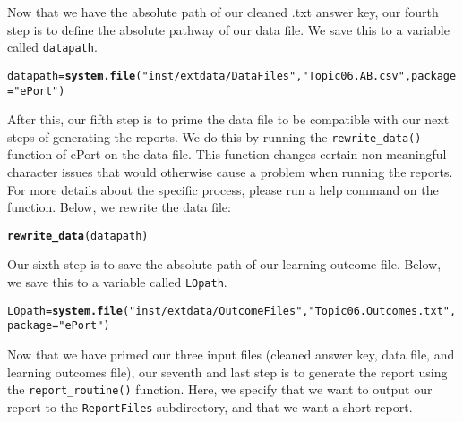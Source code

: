 \documentclass{article}\usepackage[]{graphicx}\usepackage[]{color}
\makeatletter
\newcommand{\hlstr}[1]{\textcolor[rgb]{0.192,0.494,0.8}{#1}}%
\newcommand{\hlstd}[1]{\textcolor[rgb]{0.345,0.345,0.345}{#1}}%
\newcommand{\hlkwb}[1]{\textcolor[rgb]{0.69,0.353,0.396}{#1}}%
\newcommand{\hlkwc}[1]{\textcolor[rgb]{0.333,0.667,0.333}{#1}}%
\newcommand{\hlkwd}[1]{\textcolor[rgb]{0.737,0.353,0.396}{\textbf{#1}}}%
\newenvironment{kframe}{%
 \def\at@end@of@kframe{}%
 \ifinner\ifhmode%
  \def\at@end@of@kframe{\end{minipage}}%
  \begin{minipage}{\columnwidth}%
 \fi\fi%
 \def\FrameCommand##1{\hskip\@totalleftmargin \hskip-\fboxsep
 \colorbox{shadecolor}{##1}\hskip-\fboxsep
     \hskip-\linewidth \hskip-\@totalleftmargin \hskip\columnwidth}%
 \MakeFramed {\advance\hsize-\width
   \@totalleftmargin\z@ \linewidth\hsize
   \@setminipage}}%
 {\par\unskip\endMakeFramed%
 \at@end@of@kframe}
\newenvironment{knitrout}{}{} %
\numberwithin{equation}{section} %
\makeatother
\begin{document}
Now that we have the absolute path of our cleaned .txt answer key, our fourth step is to define the absolute pathway of our data file. We save this to a variable called \texttt{datapath}.

\begin{knitrout}
\color{fgcolor}\begin{kframe}
\begin{alltt}
\hlstd{datapath} \hlkwb{=} \hlkwd{system.file}\hlstd{(}\hlstr{"inst/extdata/DataFiles"}\hlstd{,} \hlstr{"Topic06.AB.csv"}\hlstd{,} \hlkwc{package}\hlstd{=}\hlstr{"ePort"}\hlstd{)}
\end{alltt}
\end{kframe}
\end{knitrout}

After this, our fifth step is to prime the data file to be compatible with our next steps of generating the reports. We do this by running the \texttt{rewrite\_data()} function of ePort on the data file. This function changes certain non-meaningful character issues that would otherwise cause a problem when running the reports. For more details about the specific process, please run a help command on the function. Below, we rewrite the data file:

\begin{knitrout}
\color{fgcolor}\begin{kframe}
\begin{alltt}
\hlkwd{rewrite_data}\hlstd{(datapath)}
\end{alltt}
\end{kframe}
\end{knitrout}

Our sixth step is to save the absolute path of our learning outcome file. Below, we save this to a variable called \texttt{LOpath}.

\begin{knitrout}
\color{fgcolor}\begin{kframe}
\begin{alltt}
\hlstd{LOpath} \hlkwb{=} \hlkwd{system.file}\hlstd{(}\hlstr{"inst/extdata/OutcomeFiles"}\hlstd{,} \hlstr{"Topic06.Outcomes.txt"}\hlstd{,} \hlkwc{package}\hlstd{=}\hlstr{"ePort"}\hlstd{)}
\end{alltt}
\end{kframe}
\end{knitrout}

Now that we have primed our three input files (cleaned answer key, data file, and learning outcomes file), our seventh and last step is to generate the report using the \texttt{report\_routine()} function. Here, we specify that we want to output our report to the \texttt{ReportFiles} subdirectory, and that we want a short report.
\end{document}
